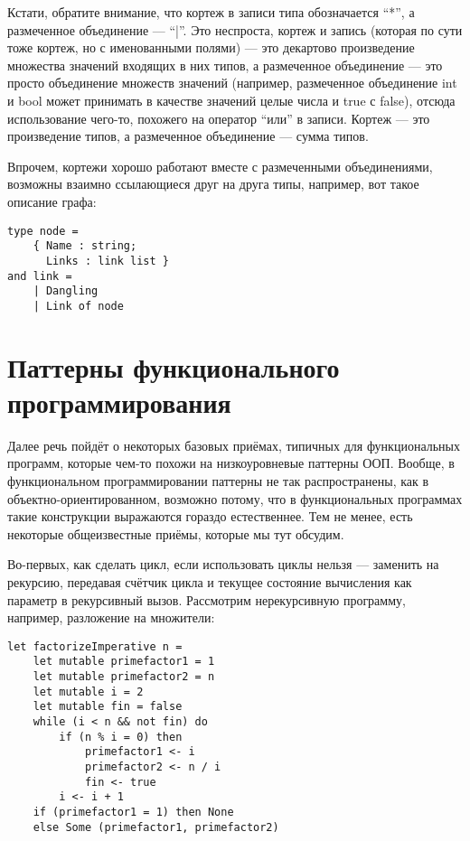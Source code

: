 \documentclass[a5paper]{article}
\begin{document}
Кстати, обратите внимание, что кортеж в записи типа обозначается ``*'', а размеченное объединение --- ``|''. Это неспроста, кортеж и запись (которая по сути тоже кортеж, но с именованными полями) --- это декартово произведение множества значений входящих в них типов, а размеченное объединение --- это просто объединение множеств значений (например, размеченное объединение int и bool может принимать в качестве значений целые числа и true с false), отсюда использование чего-то, похожего на оператор ``или'' в записи. Кортеж --- это произведение типов, а размеченное объединение --- сумма типов.

Впрочем, кортежи хорошо работают вместе с размеченными объединениями, возможны взаимно ссылающиеся друг на друга типы, например, вот такое описание графа:

\begin{verbatim}
type node =
    { Name : string;
      Links : link list }
and link =
    | Dangling
    | Link of node
\end{verbatim}

\section{Паттерны функционального программирования}

Далее речь пойдёт о некоторых базовых приёмах, типичных для функциональных программ, которые чем-то похожи на низкоуровневые паттерны ООП. Вообще, в функциональном программировании паттерны не так распространены, как в объектно-ориентированном, возможно потому, что в функциональных программах такие конструкции выражаются гораздо естественнее. Тем не менее, есть некоторые общеизвестные приёмы, которые мы тут обсудим.

Во-первых, как сделать цикл, если использовать циклы нельзя --- заменить на рекурсию, передавая счётчик цикла и текущее состояние вычисления как параметр в рекурсивный вызов. Рассмотрим нерекурсивную программу, например, разложение на множители:

\begin{verbatim}
let factorizeImperative n =
    let mutable primefactor1 = 1
    let mutable primefactor2 = n
    let mutable i = 2
    let mutable fin = false
    while (i < n && not fin) do
        if (n % i = 0) then
            primefactor1 <- i
            primefactor2 <- n / i
            fin <- true
        i <- i + 1
    if (primefactor1 = 1) then None
    else Some (primefactor1, primefactor2)
\end{verbatim}
\end{document}
